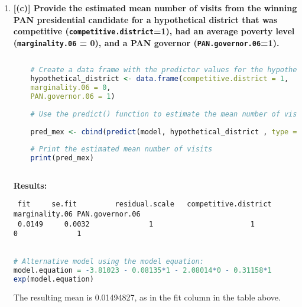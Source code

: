 \documentclass[12pt,letterpaper]{article}
\begin{document}
\begin{enumerate}
\noindent  The marginality.06 coefficient is -2.08014.
 This means that, holding other variables constant, a one-unit increase in the marginality score (which measures poverty) is associated with a decrease in the expected log-count of PAN visits by 2.08014 units. In other words, the more impoverished a district is, the less likely it is that the PAN presidential candidate visited it. \\
 \noindent The PAN.governor.06 coefficient is -0.31158.  This means that, holding other variables constant, being in a state with a PAN-affiliated governor is associated with a decrease in the expected log-count of PAN visits by 0.31158 units. However, this coefficient is only marginally significant (p-value = 0.0617), meaning that we cannot say with certainty that the presence of a PAN-affiliated governor had a significant effect on the number of PAN visits.\\
	
	\item \textbf{[(c)]
	Provide the estimated mean number of visits from the winning PAN presidential candidate for a hypothetical district that was competitive (\texttt{competitive.district}=1), had an average poverty level (\texttt{marginality.06} = 0), and a PAN governor (\texttt{PAN.governor.06}=1).}

\begin{lstlisting}[language=R]
	
	# Create a data frame with the predictor values for the hypothetical district
	hypothetical_district <- data.frame(competitive.district = 1, 
	marginality.06 = 0, 
	PAN.governor.06 = 1)
	
	# Use the predict() function to estimate the mean number of visits for the hypothetical district
	
	pred_mex <- cbind(predict(model, hypothetical_district , type ="response", se.fit = TRUE), hypothetical_district)
	
	# Print the estimated mean number of visits
	print(pred_mex)
	
\end{lstlisting}

\noindent \textbf{Results:}

\begin{verbatim}
 fit     se.fit 		residual.scale   competitive.district   marginality.06 PAN.governor.06
 0.0149 	0.0032              1                    	1             					 0            	1
\end{verbatim}
	
\begin{lstlisting}[language=R]

# Alternative model using the model equation:
model.equation = -3.81023 - 0.08135*1 - 2.08014*0 - 0.31158*1
exp(model.equation)
	\end{lstlisting}

\noindent The resulting mean is 0.01494827, as in the fit column in the table above.

\end{enumerate}
\end{document}
